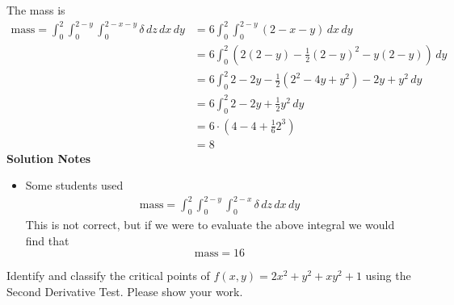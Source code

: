     \ifnum {} 
    {\color{DarkBlue} The mass is
    \begin{align}
        \text{mass}=\int_{0}^{2}\int_{0}^{2 - y} \int_0^{2 - x - y} \delta \, dz \, dx \, dy  
        &= 6 \int_{0}^{2}\int_{0}^{2 - y} (2-x-y ) \, dx \, dy \\ 
        &=6\int_{0}^{2} ( 2(2-y)  - \frac12(2-y)^2 -y(2-y) ) \, dy \\ 
        &=6\int_{0}^{2} 2 - 2y  - \frac12(2^2-4y+y^2) - 2y+y^2  \, dy \\ 
        &=6\int_{0}^{2} 2 - 2y + \frac12 y^2  \, dy \\ 
        &= 6 \cdot( 4 - 4 + \frac16 2^3 ) \\
        &= 8
    \end{align}
    \textbf{Solution Notes}
    \begin{itemize}
        \item Some students used
            \begin{align}
        \text{mass}=\int_{0}^{2}\int_{0}^{2 - y} \int_0^{2 - x } \delta \, dz \, dx \, dy  
    \end{align}
    This is not correct, but if we were to evaluate the above integral we would find that 
    $$\text{mass} = 16$$
    \end{itemize}
    }
    \else

    \fi
    
\fi



\ifnum {}

    \question[4] Identify and classify the critical points of $f(x,y) = 2x^2+y^2+xy^2+1$ using the Second Derivative Test. Please show your work. 

